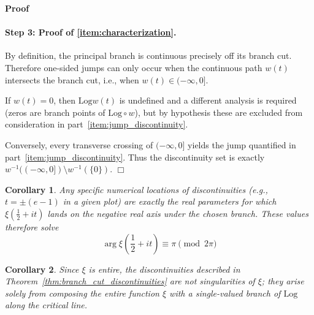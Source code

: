 \documentclass{article}
\newenvironment{proof}{\noindent\textbf{Proof\ }}{\hspace*{\fill}$\Box$\medskip}
\newtheorem{corollary}{Corollary}
\begin{document}
\begin{proof}
  \paragraph{Step 3: Proof of \eqref{item:characterization}.} By definition,
  the principal branch is continuous precisely off its branch cut. Therefore
  one-sided jumps can only occur when the continuous path $w (t)$ intersects
  the branch cut, i.e., when $w (t) \in (- \infty, 0]$.
  
  If $w (t) = 0$, then $\mathrm{Log} w (t)$ is undefined and a different
  analysis is required (zeros are branch points of $\mathrm{Log} \circ w$),
  but by hypothesis these are excluded from consideration in
  part~\eqref{item:jump_discontinuity}.
  
  Conversely, every transverse crossing of $(- \infty, 0]$ yields the jump
  quantified in part~\eqref{item:jump_discontinuity}. Thus the discontinuity
  set is exactly $w^{- 1} ((- \infty, 0]) \setminus w^{- 1} (\{0\})$.
\end{proof}

\begin{corollary}
  \label{cor:specific_locations}Any specific numerical locations of
  discontinuities (e.g., $t = \pm (e - 1)$ in a given plot) are exactly the
  real parameters for which $\xi \left( \frac{1}{2} + it \right)$ lands on the
  negative real axis under the chosen branch. These values therefore solve
  \begin{equation}
    \arg \xi \left( \frac{1}{2} + it \right) \equiv \pi \pmod{2 \pi}
  \end{equation}
\end{corollary}

\begin{corollary}
  \label{cor:nature_of_discontinuities}Since $\xi$ is entire, the
  discontinuities described in Theorem~\ref{thm:branch_cut_discontinuities}
  are not singularities of $\xi$; they arise solely from composing the entire
  function $\xi$ with a single-valued branch of $\mathrm{Log}$ along the
  critical line.
\end{corollary}
\end{document}
